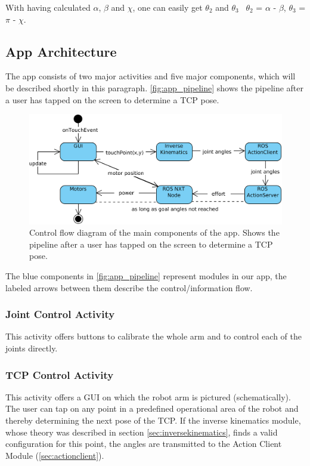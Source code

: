 \documentclass[conference]{IEEEtran}
\begin{document}
With having calculated $\alpha$, $\beta$ and $\chi$, one can easily get $\theta_2$ and $\theta_3$ \rightarrow \ $\theta_2$ = $\alpha$ - $\beta$, $\theta_3$ = $\pi$ - $\chi$.


\subsection{App Architecture}\label{sec:architecture}
The app consists of two major activities and five major components, which will be described shortly in this paragraph. \autoref{fig:app_pipeline} shows the pipeline after a user has tapped on the screen to determine a TCP pose.

\begin{figure}[htbp]
	\centerline{\includegraphics[scale=0.15]{img/app_pipeline.png}}
	\caption{Control flow diagram of the main components of the app. Shows the pipeline after a user has tapped on the screen to determine a TCP pose.}
	\label{fig:app_pipeline}
\end{figure}

The blue components in \autoref{fig:app_pipeline} represent modules in our app, the labeled arrows between them describe the control/information flow.

\subsubsection{Joint Control Activity}
This activity offers buttons to calibrate the whole arm and to control each of the joints directly.

\subsubsection{TCP Control Activity}
This activity offers a GUI on which the robot arm is pictured (schematically). The user can tap on any point in a predefined operational area of the robot and thereby determining the next pose of the TCP. If the inverse kinematics module, whose theory was described in section \ref{sec:inversekinematics}, finds a valid configuration for this point, the angles are transmitted to the Action Client Module (\ref{sec:actionclient}).
\end{document}
